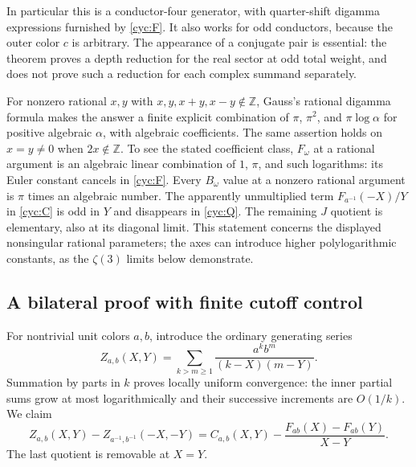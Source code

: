 \documentclass[11pt,a4paper]{article}
\numberwithin{equation}{section}
\theoremstyle{definition}
\theoremstyle{remark}
\begin{document}
In particular this is a conductor-four generator, with quarter-shift
digamma expressions furnished by \eqref{cyc:F}.  It also works for
odd conductors, because the outer color $c$ is arbitrary.  The appearance
of a conjugate pair is essential: the theorem proves a depth reduction
for the real sector at odd total weight, and does not prove such a
reduction for each complex summand separately.

For nonzero rational $x,y$ with $x,y,x+y,x-y\notin\mathbb Z$,
Gauss's rational digamma formula \cite[Eq.~(5.4.19)]{DLMFGamma}
makes the answer a finite explicit
combination of $\pi$, $\pi^2$, and $\pi\log\alpha$ for positive
algebraic $\alpha$, with algebraic coefficients.  The same assertion
holds on $x=y\ne0$ when $2x\notin\mathbb Z$.  To see the stated
coefficient class, $F_\omega$ at a rational argument is an algebraic
linear combination of $1$, $\pi$, and such logarithms: its Euler
constant cancels in \eqref{cyc:F}.  Every $B_\omega$ value at a
nonzero rational argument is $\pi$ times an algebraic number.
The apparently unmultiplied term $F_{a^{-1}}(-X)/Y$ in
\eqref{cyc:C} is odd in $Y$ and disappears in \eqref{cyc:Q}.
The remaining $J$ quotient is elementary, also at its diagonal
limit.  This statement concerns the displayed nonsingular rational
parameters; the axes can introduce higher polylogarithmic constants,
as the $\zeta(3)$ limits below demonstrate.

\subsection{A bilateral proof with finite cutoff control}

For nontrivial unit colors $a,b$, introduce the ordinary generating
series
\[
 Z_{a,b}(X,Y)=\sum_{k>m\ge1}\frac{a^k b^m}{(k-X)(m-Y)}.
\]
Summation by parts in $k$ proves locally uniform convergence: the inner
partial sums grow at most logarithmically and their successive
increments are $O(1/k)$.  We claim
\begin{equation}\label{cyc:bilateral-generator}
 Z_{a,b}(X,Y)-Z_{a^{-1},b^{-1}}(-X,-Y)
 =C_{a,b}(X,Y)-\frac{F_{ab}(X)-F_{ab}(Y)}{X-Y}.
\end{equation}
The last quotient is removable at $X=Y$.
\end{document}
